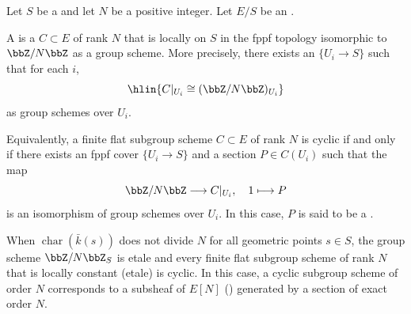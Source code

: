 \begin{definition} \label{definition:cyclic_subgroup_scheme_of_order_N_of_a_group_scheme_over_a_scheme}
    Let $S$ be a  and let $N$ be a positive integer. Let $E/S$ be an . 
    

    A  is a  $C \subset E$ of rank $N$ that is locally on $S$ in the fppf topology isomorphic to $\bbZ/N\bbZ$ as a group scheme. More precisely, there exists an  $\{U_i \to S\}$ such that for each $i$,
    $$\hlin{C|_{U_i} \cong (\bbZ/N\bbZ)_{U_i}}$$
    as group schemes over $U_i$.

    Equivalently, a finite flat subgroup scheme $C \subset E$ of rank $N$ is cyclic if and only if there exists an fppf cover $\{U_i \to S\}$ and a section $P \in C(U_i)$ such that the map
    $$\bbZ/N\bbZ \longrightarrow C|_{U_i}, \quad 1 \longmapsto P$$
    is an isomorphism of group schemes over $U_i$. In this case, $P$ is said to be a .

    When $\operatorname{char}(\bar{k}(s))$ does not divide $N$ for all geometric points $s \in S$, the group scheme $\bbZ/N\bbZ_S$ is etale and every finite flat subgroup scheme of rank $N$ that is locally constant (etale) is cyclic. In this case, a cyclic subgroup scheme of order $N$ corresponds to a subsheaf of $E[N]$ () generated by a section of exact order $N$.
\end{definition}